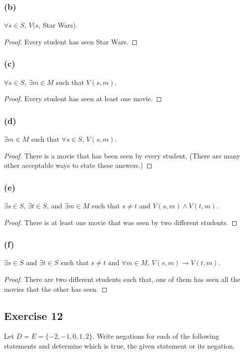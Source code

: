 \documentclass[14pt]{extarticle}
\newcommand{\fa}{\forall}
\newcommand{\te}{\exists}
\begin{document}
\subsubsection{(b)}
$\fa s \in S$, $V(s$, Star Wars).

\begin{proof}
Every student has seen Star Wars.
\end{proof}

\subsubsection{(c)}
$\fa s \in S$, $\te m \in M$ such that $V(s, m)$.

\begin{proof}
Every student has seen at least one movie.
\end{proof}

\subsubsection{(d)}
$\te m \in M$ such that $\fa s \in S$, $V(s, m)$.

\begin{proof}
There is a movie that has been seen by every student. (There are many other acceptable ways to state these answers.)
\end{proof}

\subsubsection{(e)}
$\te s \in S$, $\te t \in S$, and $\te m \in M$ such that $s \neq t$ and $V(s, m) \wedge V(t, m)$.

\begin{proof}
There is at least one movie that was seen by two different students.
\end{proof}

\subsubsection{(f)}
$\te s \in S$ and $\te t \in S$ such that $s \neq t$ and $\fa m \in M$, $V(s, m) \to V(t, m)$.

\begin{proof}
There are two different students such that, one of them has seen all the movies that the other has seen.
\end{proof}

\subsection{Exercise 12}
Let $D = E = \{-2, -1, 0, 1, 2\}$. Write negations for each of the following statements and determine which is true, the given statement or its negation.
\end{document}
